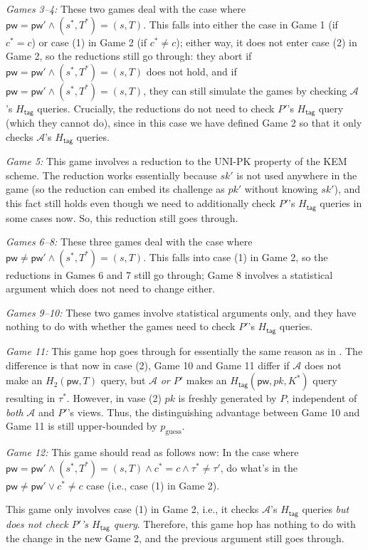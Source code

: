 \documentclass{article}
\theoremstyle{plain}
\theoremstyle{definition}
\theoremstyle{remark}
\newcommand{\adv}{\mathcal{A}}
\newcommand{\Htag}{H_\mathsf{tag}}
\newcommand{\pw}{\mathsf{pw}}
\begin{document}
\medskip\noindent\emph{Games 3--4:} These two games deal with the case where $\pw = \pw' \land (s^*,T^*) = (s,T)$. This falls into either the case in Game 1 (if $c^* = c$) or case (1) in Game 2 (if $c^* \neq c$); either way, it does not enter case (2) in Game 2, so the reductions still go through: they abort if $\pw = \pw' \land (s^*,T^*) = (s,T)$ does not hold, and if $\pw = \pw' \land (s^*,T^*) = (s,T)$, they can still simulate the games by checking $\adv$'s $\Htag$ queries. Crucially, the reductions do not need to check $P'$'s $\Htag$ query (which they cannot do), since in this case we have defined Game 2 so that it only checks $\adv$'s $\Htag$ queries.

\medskip\noindent\emph{Game 5:} This game involves a reduction to the UNI-PK property of the KEM scheme. The reduction works essentially because $sk'$ is not used anywhere in the game (so the reduction can embed its challenge as $pk'$ without knowing $sk'$), and this fact still holds even though we need to additionally check $P'$'s $\Htag$ queries in some cases now. So, this reduction still goes through.

\medskip\noindent\emph{Games 6--8:} These three games deal with the case where $\pw \neq \pw' \land (s^*,T^*) = (s,T)$. This falls into case (1) in Game 2, so the reductions in Games 6 and 7 still go through; Game 8 involves a statistical argument which does not need to change either.

\medskip\noindent\emph{Games 9--10:} These two games involve statistical arguments only, and they have nothing to do with whether the games need to check $P'$'s $\Htag$ queries.

\medskip\noindent\emph{Game 11:} This game hop goes through for essentially the same reason as in . The difference is that now in case (2), Game 10 and Game 11 differ if $\adv$ does not make an $H_2(\pw,T)$ query, but $\adv$ \emph{{\color{blue}or $P'$}} makes an $\Htag(\pw,pk,K^*)$ query resulting in $\tau^*$. However, in vase (2) $pk$ is freshly generated by $P$, independent of \emph{both} $\adv$ and $P'$'s views. Thus, the distinguishing advantage between Game 10 and Game 11 is still upper-bounded by $p_\text{guess}$.

\medskip\noindent\emph{Game 12:} This game should read as follows now: In the case where $\pw = \pw' \land (s^*,T^*) = (s,T) \land c^* = c \land \tau^* \neq \tau'$, do what's in the {\color{blue}$\pw \neq \pw' \lor c^* \neq c$ case (i.e., case (1) in Game 2)}.

This game only involves case (1) in Game 2, i.e., it checks $\adv$'s $\Htag$ queries \emph{but does not check $P'$'s $\Htag$ query}. Therefore, this game hop has nothing to do with the change in the new Game 2, and the previous argument still goes through.
\end{document}
